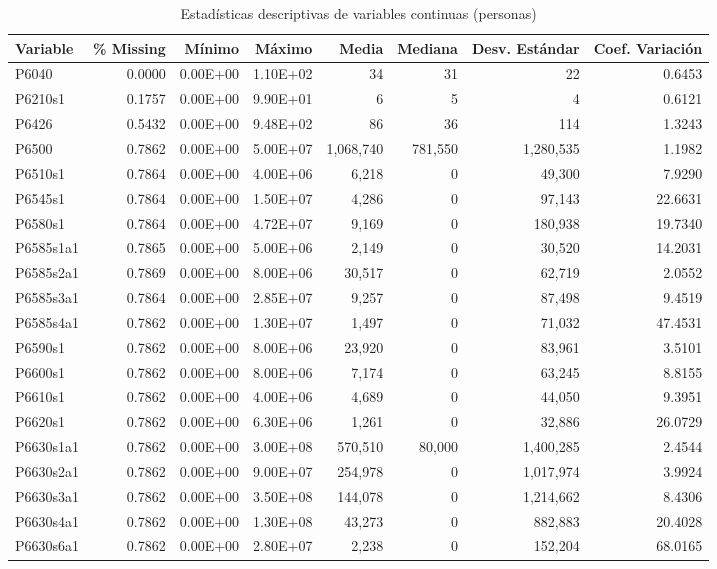 \begin{table}[H]
\centering
\caption{Estadísticas descriptivas de variables continuas (personas)}
\label{tab:descriptiva_personas_continua}
\begin{tabular}{lrrrrrrr}
\toprule
Variable & \% Missing & Mínimo & Máximo & Media & Mediana & Desv. Estándar & Coef. Variación \\
\midrule
P6040 & 0.0000 & 0.00E+00 & 1.10E+02 & 34 & 31 & 22 & 0.6453 \\
P6210s1 & 0.1757 & 0.00E+00 & 9.90E+01 & 6 & 5 & 4 & 0.6121 \\
P6426 & 0.5432 & 0.00E+00 & 9.48E+02 & 86 & 36 & 114 & 1.3243 \\
P6500 & 0.7862 & 0.00E+00 & 5.00E+07 & 1,068,740 & 781,550 & 1,280,535 & 1.1982 \\
P6510s1 & 0.7864 & 0.00E+00 & 4.00E+06 & 6,218 & 0 & 49,300 & 7.9290 \\
P6545s1 & 0.7864 & 0.00E+00 & 1.50E+07 & 4,286 & 0 & 97,143 & 22.6631 \\
P6580s1 & 0.7864 & 0.00E+00 & 4.72E+07 & 9,169 & 0 & 180,938 & 19.7340 \\
P6585s1a1 & 0.7865 & 0.00E+00 & 5.00E+06 & 2,149 & 0 & 30,520 & 14.2031 \\
P6585s2a1 & 0.7869 & 0.00E+00 & 8.00E+06 & 30,517 & 0 & 62,719 & 2.0552 \\
P6585s3a1 & 0.7864 & 0.00E+00 & 2.85E+07 & 9,257 & 0 & 87,498 & 9.4519 \\
P6585s4a1 & 0.7862 & 0.00E+00 & 1.30E+07 & 1,497 & 0 & 71,032 & 47.4531 \\
P6590s1 & 0.7862 & 0.00E+00 & 8.00E+06 & 23,920 & 0 & 83,961 & 3.5101 \\
P6600s1 & 0.7862 & 0.00E+00 & 8.00E+06 & 7,174 & 0 & 63,245 & 8.8155 \\
P6610s1 & 0.7862 & 0.00E+00 & 4.00E+06 & 4,689 & 0 & 44,050 & 9.3951 \\
P6620s1 & 0.7862 & 0.00E+00 & 6.30E+06 & 1,261 & 0 & 32,886 & 26.0729 \\
P6630s1a1 & 0.7862 & 0.00E+00 & 3.00E+08 & 570,510 & 80,000 & 1,400,285 & 2.4544 \\
P6630s2a1 & 0.7862 & 0.00E+00 & 9.00E+07 & 254,978 & 0 & 1,017,974 & 3.9924 \\
P6630s3a1 & 0.7862 & 0.00E+00 & 3.50E+08 & 144,078 & 0 & 1,214,662 & 8.4306 \\
P6630s4a1 & 0.7862 & 0.00E+00 & 1.30E+08 & 43,273 & 0 & 882,883 & 20.4028 \\
P6630s6a1 & 0.7862 & 0.00E+00 & 2.80E+07 & 2,238 & 0 & 152,204 & 68.0165 \\

\end{tabular}
\end{table}
